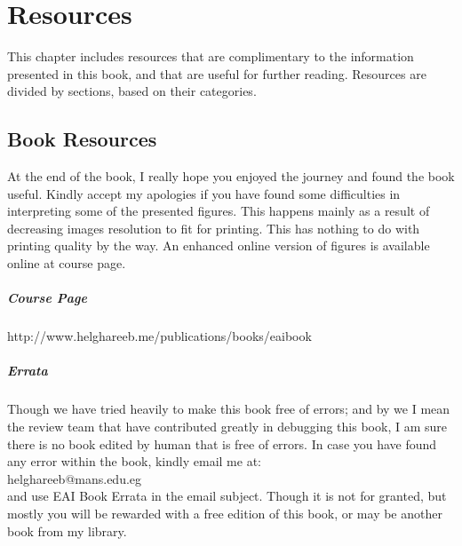 \documentclass[12pt,a4paper,final,twoside,onecolumn,titlepage]{book}
\begin{document}
\appendix
\renewcommand\chaptername{Appendix}
\chapter{Resources}
This chapter includes resources that are complimentary to the information presented in this book, and that are useful for further reading. Resources are divided by sections, based on their categories.
\section{Book Resources}
At the end of the book, I really hope you enjoyed the journey and found the book useful. Kindly accept my apologies if you have found some difficulties in interpreting some of the presented figures. This happens mainly as a result of decreasing images resolution to fit for printing. This has nothing to do with printing quality by the way. An enhanced online version of figures is available online at course page.
\paragraph{Course Page}
http://www.helghareeb.me/publications/books/eaibook
\paragraph{Errata}
Though we have tried heavily to make this book free of errors; and by we I mean the review team that have contributed greatly in debugging this book, I am sure there is no book edited by human that is free of errors. In case you have found any error within the book, kindly email me at:\\
helghareeb@mans.edu.eg\\
and use EAI Book Errata in the email subject. Though it is not for granted, but mostly you will be rewarded with a free edition of this book, or may be another book from my library.
\end{document}
